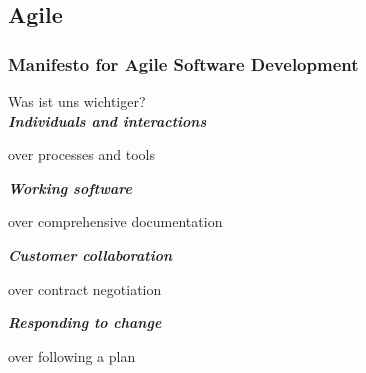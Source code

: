 

\subsection{Agile}
\frame
{
  \frametitle{Manifesto for Agile Software Development}
  Was ist uns wichtiger?\\
  \bigskip
\textbf{\textit{Individuals and interactions}}
  \begin{flushright}
  over processes and tools
  \end{flushright}
\textbf{\textit{Working software}}
  \begin{flushright}
  over comprehensive documentation
  \end{flushright}
\textbf{\textit{Customer collaboration}}
  \begin{flushright}
  over contract negotiation
  \end{flushright}
\textbf{\textit{Responding to change}}
\small
  \begin{flushright}
  over following a plan\\
  \end{flushright}
\bigskip
\small
\href{http://agilemanifesto.org}{}
\normalsize
}

